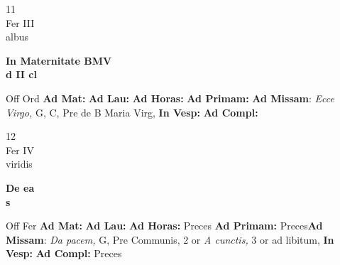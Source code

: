 \documentclass[10pt, openany]{book}
\begin{document}
    \begin{center}
        \begin{minipage}{3.5in}
            \vspace{2em}
            \begin{minipage}{0.5in}
                {\Huge 11} \\
                {\normalsize Fer III} \\
                {\normalsize albus}
            \end{minipage}
            \begin{minipage}{3.0in}
                \textbf{ \large In Maternitate BMV \\
                \textnormal{\normalsize d II cl}} \\ 
            \end{minipage}
            \begin{justify}Off Ord
                \textbf{Ad Mat: }
                \textbf{Ad Lau: }
                \textbf{Ad Horas: }
                \textbf{Ad Primam: }\textbf{Ad Missam}: \textit{Ecce Virgo,} G, C, Pre de B Maria Virg,  
                \textbf{In Vesp: }
                \textbf{Ad Compl: }
            \end{justify}
        \end{minipage}
    \end{center}

    \begin{center}
        \begin{minipage}{3.5in}
            \vspace{2em}
            \begin{minipage}{0.5in}
                {\Huge 12} \\
                {\normalsize Fer IV} \\
                {\normalsize viridis}
            \end{minipage}
            \begin{minipage}{3.0in}
                \textbf{ \large De ea \\
                \textnormal{\normalsize s}} \\ 
            \end{minipage}
            \begin{justify}Off Fer
                \textbf{Ad Mat: }
                \textbf{Ad Lau: }
                \textbf{Ad Horas: }Preces
                \textbf{Ad Primam: }Preces\textbf{Ad Missam}: \textit{Da pacem,} G, Pre Communis, 2 or \textit{A cunctis,} 3 or ad libitum,  
                \textbf{In Vesp: }
                \textbf{Ad Compl: }Preces
            \end{justify}
        \end{minipage}
    \end{center}
\end{document}
